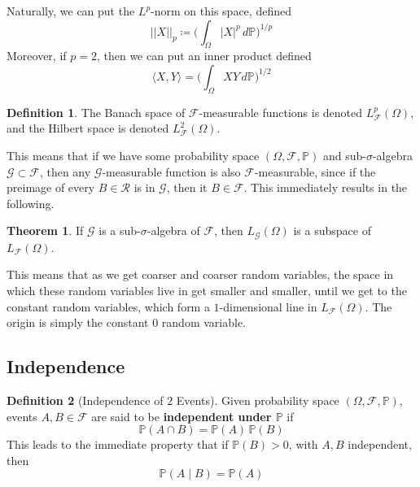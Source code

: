 \documentclass{article}
\theoremstyle{definition}
\newtheorem{theorem}{Theorem}[section]
\theoremstyle{remark}
\theoremstyle{definition}
\newtheorem{definition}{Definition}[section]
\begin{document}
Naturally, we can put the $L^p$-norm on this space, defined 
\[||X||_p \coloneqq \bigg( \int_\Omega |X|^p \, d\mathbb{P} \bigg)^{1/p}\]
Moreover, if $p = 2$, then we can put an inner product defined 
\[\langle X, Y \rangle = \bigg( \int_\Omega X Y \,d \mathbb{P} \bigg)^{1/2}\]

\begin{definition}
The Banach space of $\mathcal{F}$-measurable functions is denoted $L_\mathcal{F}^p (\Omega)$, and the Hilbert space is denoted $L_\mathcal{F}^2 (\Omega)$. 
\end{definition}

This means that if we have some probability space $(\Omega, \mathcal{F}, \mathbb{P})$ and  sub-$\sigma$-algebra $\mathcal{G} \subset \mathcal{F}$, then any $\mathcal{G}$-measurable function is also $\mathcal{F}$-measurable, since if the preimage of every $B \in \mathcal{R}$ is in $\mathcal{G}$, then it $B \in \mathcal{F}$. This immediately results in the following. 

\begin{theorem}
If $\mathcal{G}$ is a sub-$\sigma$-algebra of $\mathcal{F}$, then $L_\mathcal{G} (\Omega)$ is a subspace of $L_\mathcal{F} (\Omega)$. 
\end{theorem}

This means that as we get coarser and coarser random variables, the space in which these random variables live in get smaller and smaller, until we get to the constant random variables, which form a $1$-dimensional line in $L_\mathcal{F} (\Omega)$. The origin is simply the constant $0$ random variable. 

\subsection{Independence}

\begin{definition}[Independence of $2$ Events]
Given probability space $(\Omega, \mathcal{F}, \mathbb{\mathbb{P}})$, events $A, B \in \mathcal{F}$ are said to be \textbf{independent under $\mathbf{\mathbb{P}}$} if 
\[\mathbb{P}(A \cap B) = \mathbb{P}(A) \, \mathbb{P}(B)\]
This leads to the immediate property that if $\mathbb{P}(B) > 0$, with $A, B$ independent, then 
\[\mathbb{P}(A \mid B) = \mathbb{P}(A)\]
\end{definition}
\end{document}
